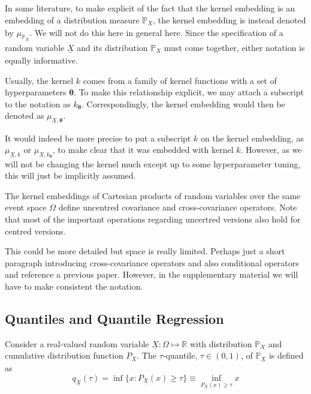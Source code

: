\documentclass[twoside]{article} \usepackage{aistats2017}
\newcommand{\rv}[1]{\underline{#1}}
\newcommand{\warn}[1]{{\color{RedOrange} #1}}
\newcommand{\extra}[1]{{\color{ForestGreen} #1}}
\begin{document}
		\extra{In some literature, to make explicit of the fact that the kernel embedding is an embedding of a distribution measure $\mathbb{P}_{\rv{X}}$, the kernel embedding is instead denoted by $\mu_{\mathbb{P}_{\rv{X}}}$. We will not do this here in general here. Since the specification of a random variable $\rv{X}$ and its distribution $\mathbb{P}_{\rv{X}}$ must come together, either notation is equally informative.}
		 
		Usually, the kernel $k$ comes from a family of kernel functions with a set of hyperparameters $\bm{\theta}$. To make this relationship explicit, we may attach a subscript to the notation as $k_{\bm{\theta}}$. Correspondingly, the kernel embedding would then be denoted as $\mu_{\rv{X}, \bm{\theta}}$.

		\extra{It would indeed be more precise to put a subscript $k$ on the kernel embedding, as $\mu_{\rv{X}, k}$ or $\mu_{\rv{X}, k_{\bm{\theta}}}$, to make clear that it was embedded with kernel $k$. However, as we will not be changing the kernel much except up to some hyperparameter tuning, this will just be implicitly assumed.}
			 
		\extra{The kernel embeddings of Cartesian products of random variables over the same event space $\Omega$ define uncentred covariance and cross-covariance operators. Note that most of the important operations regarding uncertred versions also hold for centred versions.}
		 
		\warn{This could be more detailed but space is really limited. Perhaps just a short paragraph introducing cross-covariance operators and also conditional operators and reference a previous paper. However, in the supplementary material we will have to make consistent the notation.}

		
	\subsection{Quantiles and Quantile Regression}
	
		Consider a real-valued random variable $\rv{X} : \Omega \mapsto \mathbb{R}$ with distribution $\mathbb{P}_{X}$ and cumulative distribution function $P_{\rv{X}}$. The $\tau$-quantile, $\tau \in (0, 1)$, of $\mathbb{P}_{\rv{X}}$ is defined as
		\begin{equation}
			q_{\rv{X}}(\tau) = \inf\{x : P_{\rv{X}}(x) \geq \tau\} \equiv \inf_{P_{\rv{X}}(x) \geq \tau} x
		\label{eq:quantile}
		\end{equation}
		
\end{document}
